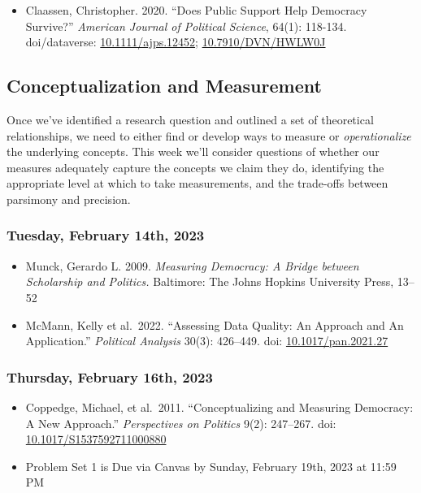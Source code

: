 \documentclass[12pt,]{article}
\providecommand{\tightlist}{%
  \setlength{\itemsep}{0pt}\setlength{\parskip}{0pt}}
\begin{document}
\begin{itemize}
\tightlist
\item
  Claassen, Christopher. 2020. ``Does Public Support Help Democracy
  Survive?'' \emph{American Journal of Political Science}, 64(1):
  118-134. doi/dataverse:
  \href{https://doi.org/10.1111/ajps.12452}{10.1111/ajps.12452};
  \href{https://doi.org/10.7910/DVN/HWLW0J}{10.7910/DVN/HWLW0J}
\end{itemize}

\hypertarget{conceptualization-and-measurement}{%
\subsection{Conceptualization and
Measurement}\label{conceptualization-and-measurement}}

\noindent Once we've identified a research question and outlined a set
of theoretical relationships, we need to either find or develop ways to
measure or \emph{operationalize} the underlying concepts. This week
we'll consider questions of whether our measures adequately capture the
concepts we claim they do, identifying the appropriate level at which to
take measurements, and the trade-offs between parsimony and precision.

\hypertarget{tuesday-february-14th-2023}{%
\subsubsection{Tuesday, February 14th,
2023}\label{tuesday-february-14th-2023}}

\begin{itemize}
\item
  Munck, Gerardo L. 2009. \emph{Measuring Democracy: A Bridge between
  Scholarship and Politics.} Baltimore: The Johns Hopkins University
  Press, 13--52
\item
  McMann, Kelly et al.~2022. ``Assessing Data Quality: An Approach and
  An Application.'' \emph{Political Analysis} 30(3): 426--449. doi:
  \href{https://doi.org/10.1017/pan.2021.27}{10.1017/pan.2021.27}
\end{itemize}

\hypertarget{thursday-february-16th-2023}{%
\subsubsection{Thursday, February 16th,
2023}\label{thursday-february-16th-2023}}

\begin{itemize}
\item
  Coppedge, Michael, et al.~2011. ``Conceptualizing and Measuring
  Democracy: A New Approach.'' \emph{Perspectives on Politics} 9(2):
  247--267. doi:
  \href{https://doi.org/10.1017/S1537592711000880}{10.1017/S1537592711000880}
\item
  Problem Set 1 is Due via Canvas by Sunday, February 19th, 2023 at
  11:59 PM
\end{itemize}
\end{document}
